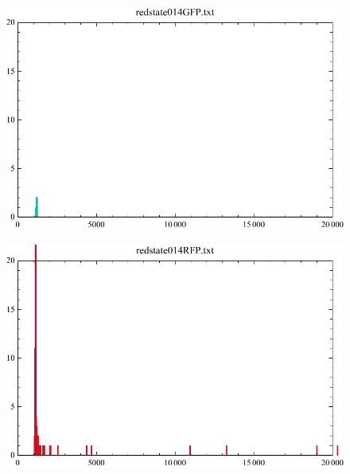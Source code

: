 \documentclass[english,11pt,a4paper]{article}
\begin{document}
\begin{figure}[h]
\centering
	\begin{minipage}{.5\textwidth}
  		\centering
  		\includegraphics[width=.9\linewidth]{redstate014GFP.pdf}
  		\label{fig:onc2GFPRedState}
	\end{minipage}%
	\begin{minipage}{.5\textwidth}
  		\centering
  		\includegraphics[width=.9\linewidth]{redstate014RFP.pdf}
  		\label{fig:onc2RFPRedState}  
	\end{minipage}
\end{figure}
\end{document}
